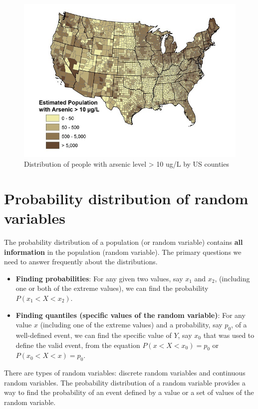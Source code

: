 \documentclass[
]{book}
\begin{document}
\begin{figure}

{\centering \includegraphics[width=0.8\linewidth]{img04/w04-CountyMapForArsenicDist} 

}

\caption{Distribution of people with arsenic level > 10 ug/L by US counties}\label{fig:unnamed-chunk-59}
\end{figure}

\hypertarget{probability-distribution-of-random-variables}{%
\section{Probability distribution of random variables}\label{probability-distribution-of-random-variables}}

The probability distribution of a population (or random variable) contains \textbf{all information} in the population (random variable). The primary questions we need to answer frequently about the distributions.

\begin{itemize}
\item
  \textbf{Finding probabilities}: For any given two values, say \(x_1\) and \(x_2\), (including one or both of the extreme values), we can find the probability \(P(x_1 < X < x_2)\).
\item
  \textbf{Finding quantiles (specific values of the random variable)}: For any value \(x\) (including one of the extreme values) and a probability, say \(p_0\), of a well-defined event, we can find the specific value of \(Y\), say \(x_0\) that was used to define the valid event, from the equation \(P(x < X <x_0) = p_0\) or \(P(x_0 < X <x) = p_0\).
\end{itemize}

There are types of random variables: discrete random variables and continuous random variables. The probability distribution of a random variable provides a way to find the probability of an event defined by a value or a set of values of the random variable.
\end{document}
